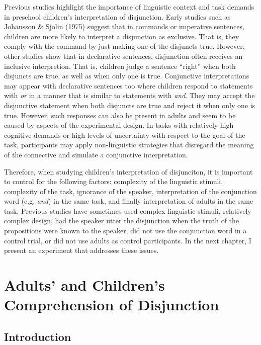 \documentclass[oneside]{report}
\theoremstyle{definition}
\theoremstyle{definition}
\theoremstyle{definition}
\theoremstyle{remark}
\begin{document}
Previous studies highlight the importance of linguistic context and task
demands in preschool children's interpretation of disjunction. Early
studies such as Johansson \& Sjolin (1975) suggest that in commands or
imperative sentences, children are more likely to interpret a
disjunction as exclusive. That is, they comply with the command by just
making one of the disjuncts true. However, other studies show that in
declarative sentences, disjunction often receives an inclusive
interpretion. That is, children judge a sentence ``right'' when both
disjuncts are true, as well as when only one is true. Conjunctive
interpretations may appear with declarative sentences too where children
respond to statements with \emph{or} in a manner that is similar to
statements with \emph{and}. They may accept the disjunctive statement
when both disjuncts are true and reject it when only one is true.
However, such responses can also be present in adults and seem to be
caused by aspects of the experimental design. In tasks with relatively
high cognitive demands or high levels of uncertainty with respect to the
goal of the task, participants may apply non-linguistic strategies that
disregard the meaning of the connective and simulate a conjunctive
interpretation.

Therefore, when studying children's interpretation of disjunciton, it is
important to control for the following factors: complexity of the
linguistic stimuli, complexity of the task, ignorance of the speaker,
interpretation of the conjunction word (e.g. \emph{and}) in the same
task, and finally interpretation of adults in the same task. Previous
studies have sometimes used complex linguistic stimuli, relatively
complex design, had the speaker utter the disjunction when the truth of
the propositions were known to the speaker, did not use the conjunction
word in a control trial, or did not use adults as control participants.
In the next chapter, I present an experiment that addresses these
issues.

\chapter{Adults' and Children's Comprehension of
Disjunction}\label{comprehension}

\section{Introduction}\label{introduction-5}
\end{document}
